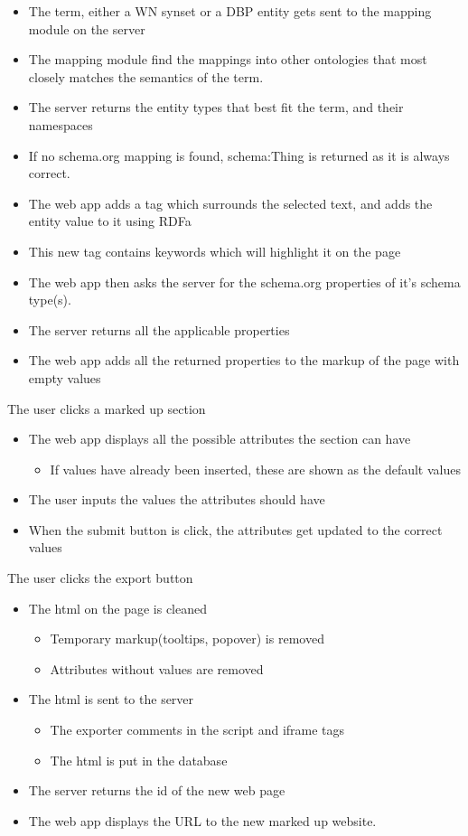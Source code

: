 \begin{itemize}
	\item The term, either a WN synset or a DBP entity gets sent to the mapping module on the server
	\item The mapping module find the mappings into other ontologies
		that most closely matches the semantics of the term.
	\item The server returns the entity types that best fit the term, and their namespaces
		\item If no schema.org mapping is found, schema:Thing is returned as it is always correct.
	\item The web app adds a tag which surrounds the selected text, and adds the entity value to it using RDFa
		\item This new tag contains keywords which will highlight it on the page
	\item The web app then asks the server for the schema.org properties of it's schema type(s).
	\item The server returns all the applicable properties
	\item The web app adds all the returned properties to the markup of the page with empty values
\end{itemize}
The user clicks a marked up section
\begin{itemize}
	\item The web app displays all the possible attributes the section can have
	\begin{itemize}
		\item If values have already been inserted, these are shown as the default values
	\end{itemize}
	\item The user inputs the values the attributes should have
	\item When the submit button is click, the attributes get updated to the correct values
\end{itemize}
The user clicks the export button
\begin{itemize}
	\item The html on the page is cleaned
	\begin{itemize}
		\item Temporary markup(tooltips, popover) is removed
		\item Attributes without values are removed
	\end{itemize}
	\item The html is sent to the server
	\begin{itemize}
		\item The exporter comments in the script and iframe tags
		\item The html is put in the database
	\end{itemize}
	\item The server returns the id of the new web page
	\item The web app displays the URL to the new marked up website.
\end{itemize}
